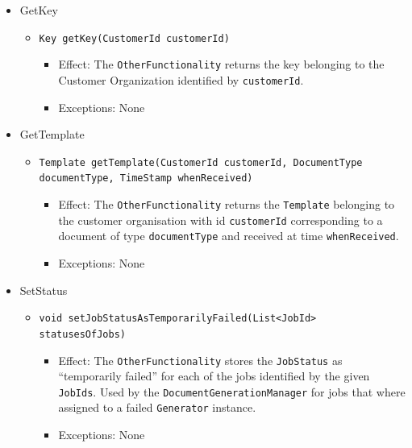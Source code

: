 \documentclass[a4paper,10pt]{article}
\begin{document}
\begin{itemize}
    \item GetKey
    \begin{itemize}
        \item \texttt{Key getKey(CustomerId customerId)}
        \begin{itemize}
            \item Effect: The \texttt{OtherFunctionality} returns the key belonging to the Customer Organization identified by \texttt{customerId}.
            \item Exceptions: None
        \end{itemize}
    \end{itemize}
    
    \item GetTemplate
    \begin{itemize}
        \item \texttt{Template getTemplate(CustomerId customerId, DocumentType documentType, TimeStamp whenReceived)}
        \begin{itemize}
            \item Effect:  The \texttt{OtherFunctionality} returns the \texttt{Template} belonging to the customer organisation with id \texttt{customerId} corresponding to a document of type \texttt{documentType} and received at time \texttt{whenReceived}. 
            \item Exceptions: None
        \end{itemize}
    \end{itemize}
        
    \item SetStatus
    \begin{itemize}
        \item \texttt{void setJobStatusAsTemporarilyFailed(List<JobId> statusesOfJobs)}
        \begin{itemize}
            \item Effect: The \texttt{OtherFunctionality} stores the \texttt{JobStatus} as ``temporarily failed'' for each of the jobs identified by the given \texttt{JobIds}. Used by the \texttt{DocumentGenerationManager} for jobs that where assigned to a failed \texttt{Generator} instance.
            \item Exceptions: None
        \end{itemize}
    \end{itemize}
    

\end{itemize}
\end{document}
